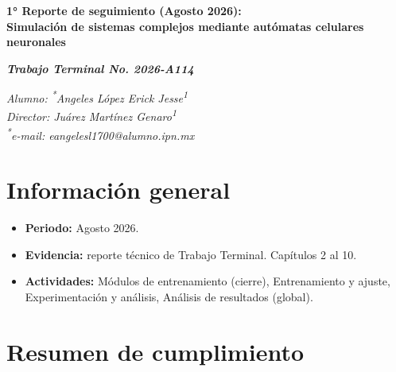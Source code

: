 \documentclass[letterpaper,10pt,oneside]{article}
\newcommand\authormark[1]{\textsuperscript{#1}}
\def\numReporte{1}
\def\mes{Agosto}
\begin{document}
	\begin{center}
		\fontsize{14}{16}\selectfont\bfseries
		\numReporte° Reporte de seguimiento (\mes{} 2026): \\
		Simulación de sistemas complejos mediante autómatas celulares neuronales
	\end{center}

	\begin{center}
		\fontsize{14}{16}\selectfont\bfseries
		\textit{Trabajo Terminal No. 2026-A114}
	\end{center}

	\begin{center}
		\fontsize{12}{16}\selectfont
		\textit{Alumno: \authormark{*}Angeles López Erick Jesse\authormark{1}} \\
		\textit{Director: Juárez Martínez Genaro\authormark{1}} \\
		\textit{\authormark{*}e-mail: eangelesl1700@alumno.ipn.mx}
	\end{center}

	\section{Información general}

	\begin{itemize}[leftmargin=*]
		\item \textbf{Periodo:} \mes{} 2026.
		\item \textbf{Evidencia:} reporte técnico de Trabajo Terminal. Capítulos 2 al 10.
		\item \textbf{Actividades:} Módulos de entrenamiento (cierre), Entrenamiento y ajuste, Experimentación y análisis, Análisis de resultados (global).
	\end{itemize}

	\section{Resumen de cumplimiento}
\end{document}
